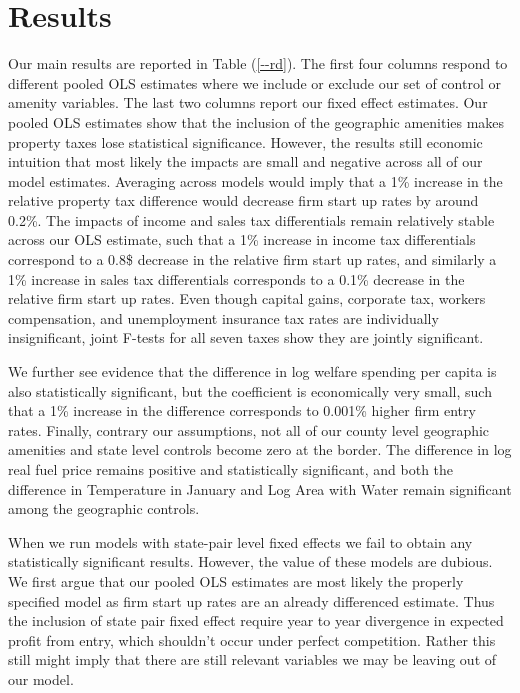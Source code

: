 \section{Results}

Our main results are reported in Table (\ref{--rd}). The first four columns respond to different pooled OLS estimates where we include or exclude our set of control or amenity variables. The last two columns report our fixed effect estimates. Our pooled OLS estimates show that the inclusion of the geographic amenities makes property taxes lose statistical significance. However, the results still economic intuition that most likely the impacts are small and negative across all of our model estimates. Averaging across models would imply that a 1\% increase in the relative property tax difference would decrease firm start up rates by around 0.2\%. The impacts of income and sales tax differentials remain relatively stable across our OLS estimate, such that a 1\% increase in income tax differentials correspond to a 0.8\$ decrease in the relative firm start up rates, and similarly a 1\% increase in sales tax differentials corresponds to a 0.1\% decrease in the relative firm start up rates. Even though capital gains, corporate tax, workers compensation, and unemployment insurance tax rates are individually insignificant, joint F-tests for all seven taxes show they are jointly significant.

We further see evidence that the difference in log welfare spending per capita is also statistically significant, but the coefficient is economically very small, such that a 1\% increase in the difference corresponds to 0.001\% higher firm entry rates. Finally, contrary our assumptions, not all of our county level geographic amenities and state level controls become zero at the border. The difference in log real fuel price remains positive and statistically significant, and both the difference in Temperature in January and Log Area with Water remain significant among the geographic controls.

When we run models with state-pair level fixed effects we fail to obtain any statistically significant results. However, the value of these models are dubious. We first argue that our pooled OLS estimates are most likely the properly specified model as firm start up rates are an already differenced estimate. Thus the inclusion of state pair fixed effect require year to year divergence in expected profit from entry, which shouldn't occur under perfect competition. Rather this still might imply that there are still relevant variables we may be leaving out of our model.

